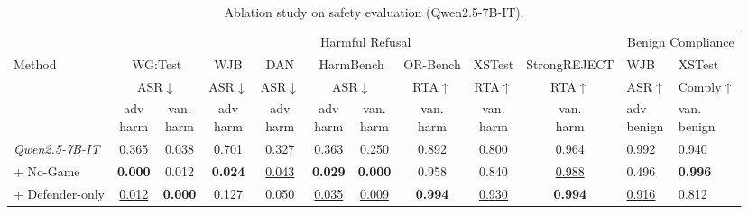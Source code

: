 \documentclass[11pt, letterpaper]{template}
\theoremstyle{plain}
\theoremstyle{definition}
\theoremstyle{remark}
\begin{document}
\begin{table}[ht]
\centering
\caption{Ablation study on safety evaluation (Qwen2.5-7B-IT). }
\label{tab:qwen7b_ablation_safety}
\setlength{\tabcolsep}{3.2pt}
\renewcommand{\arraystretch}{1.15}
\scriptsize
\begin{tabular}{lccccccccc p{1.35cm} p{1.45cm}}
\toprule
& \multicolumn{9}{c}{Harmful Refusal} & \multicolumn{2}{c}{Benign Compliance} \\
\cmidrule(lr){2-10}\cmidrule(lr){11-12}
Method
& \multicolumn{2}{c}{WG:Test}
& WJB
& DAN
& \multicolumn{2}{c}{HarmBench}
& OR-Bench
& XSTest
& StrongREJECT
& WJB
& XSTest \\
& \multicolumn{2}{c}{ASR$\downarrow$}
& ASR$\downarrow$
& ASR$\downarrow$
& \multicolumn{2}{c}{ASR$\downarrow$}
& RTA$\uparrow$
& RTA$\uparrow$
& RTA$\uparrow$
& ASR$\uparrow$
& Comply$\uparrow$ \\
\cmidrule(lr){2-3}\cmidrule(lr){4-4}\cmidrule(lr){5-5}\cmidrule(lr){6-7}\cmidrule(lr){8-8}\cmidrule(lr){9-9}\cmidrule(lr){10-10}\cmidrule(lr){11-11}\cmidrule(lr){12-12}
& \makecell{adv\\harm}
& \makecell{van.\\harm}
& \makecell{adv\\harm}
& \makecell{adv\\harm}
& \makecell{adv\\harm}
& \makecell{van.\\harm}
& \makecell{van.\\harm}
& \makecell{van.\\harm}
& \makecell{van.\\harm}
& \makecell{adv\\benign}
& \makecell{van.\\benign} \\
\midrule

\textit{Qwen2.5-7B-IT} & 0.365 & 0.038 & 0.701 & 0.327 & 0.363 & 0.250 & 0.892 & 0.800 & 0.964 & 0.992 & 0.940 \\

\quad + No-Game
& \textbf{0.000} & 0.012 & \textbf{0.024} & \underline{0.043} & \textbf{0.029} & \textbf{0.000}
& 0.958 & 0.840 & \underline{0.988}
& \cellcolor{green!15}0.496 & \textbf{0.996} \\

\quad + Defender-only
& \underline{0.012} & \textbf{0.000} & 0.127 & 0.050 & \underline{0.035} & \underline{0.009}
& \textbf{0.994} & \underline{0.930} & \textbf{0.994}
& \underline{0.916} & \cellcolor{green!15}0.812 \\


\end{tabular}
\end{table}
\end{document}

